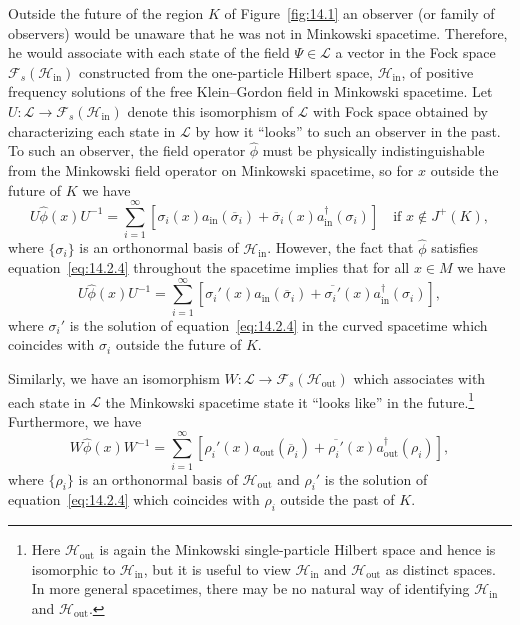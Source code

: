 Outside the future of the region \(K\) of Figure~\ref{fig:14.1} an observer (or family
of observers) would be unaware that he was not in Minkowski spacetime. Therefore,
he would associate with each state of the field \(\Psi\in\mathcal L\) a vector in the
Fock space \(\mathcal F_s(\mathcal H_{\mathrm{in}})\) constructed from the
one-particle Hilbert space, \(\mathcal H_{\mathrm{in}}\), of positive frequency
solutions of the free Klein--Gordon field in Minkowski spacetime. Let
\(U:\mathcal L\longrightarrow\mathcal F_s(\mathcal H_{\mathrm{in}})\) denote this
isomorphism of \(\mathcal L\) with Fock space obtained by characterizing each state
in \(\mathcal L\) by how it ``looks'' to such an observer in the past. To such an
observer, the field operator \(\widehat\phi\) must be physically indistinguishable
from the Minkowski field operator on Minkowski spacetime, so for \(x\) outside the
future of \(K\) we have
\begin{equation}
  U\widehat\phi(x)U^{-1}
  =\sum_{i=1}^{\infty}\left[
    \sigma_i(x)a_{\mathrm{in}}(\overline\sigma_i)
    +\overline\sigma_i(x)a_{\mathrm{in}}^\dagger(\sigma_i)\right]
  \quad\text{if }x\notin J^+(K),
  \tag{14.2.14}\label{eq:14.2.14}
\end{equation}
where \(\{\sigma_i\}\) is an orthonormal basis of
\(\mathcal H_{\mathrm{in}}\). However, the fact that \(\widehat\phi\) satisfies
equation~\eqref{eq:14.2.4} throughout the spacetime implies that for all \(x\in M\)
we have
\begin{equation}
  U\widehat\phi(x)U^{-1}
  =\sum_{i=1}^{\infty}\left[
    \sigma_i'(x)a_{\mathrm{in}}(\overline\sigma_i)
    +\overline{\sigma_i'}(x)a_{\mathrm{in}}^\dagger(\sigma_i)\right],
  \tag{14.2.15}\label{eq:14.2.15}
\end{equation}
where \(\sigma_i'\) is the solution of equation~\eqref{eq:14.2.4} in the curved
spacetime which coincides with \(\sigma_i\) outside the future of \(K\).

Similarly, we have an isomorphism
\(W:\mathcal L\longrightarrow\mathcal F_s(\mathcal H_{\mathrm{out}})\) which
associates with each state in \(\mathcal L\) the Minkowski spacetime state it
``looks like'' in the future.\footnote{Here \(\mathcal H_{\mathrm{out}}\) is again the
Minkowski single-particle Hilbert space and hence is isomorphic to
\(\mathcal H_{\mathrm{in}}\), but it is useful to view
\(\mathcal H_{\mathrm{in}}\) and \(\mathcal H_{\mathrm{out}}\) as distinct
spaces. In more general spacetimes, there may be no natural way of identifying
\(\mathcal H_{\mathrm{in}}\) and \(\mathcal H_{\mathrm{out}}\).} Furthermore,
we have
\begin{equation}
  W\widehat\phi(x)W^{-1}
  =\sum_{i=1}^{\infty}\left[
    \rho_i'(x)a_{\mathrm{out}}(\overline\rho_i)
    +\overline{\rho_i'}(x)a_{\mathrm{out}}^\dagger(\rho_i)\right],
  \tag{14.2.16}\label{eq:14.2.16}
\end{equation}
where \(\{\rho_i\}\) is an orthonormal basis of
\(\mathcal H_{\mathrm{out}}\) and \(\rho_i'\) is the solution of
equation~\eqref{eq:14.2.4} which coincides with \(\rho_i\) outside the past of
\(K\).

